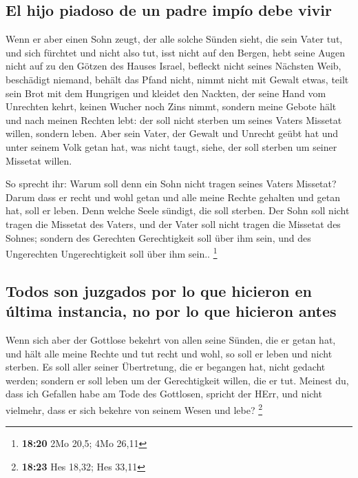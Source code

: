 \hypertarget{el-hijo-piadoso-de-un-padre-impuxedo-debe-vivir}{%
\subsection{El hijo piadoso de un padre impío debe
vivir}\label{el-hijo-piadoso-de-un-padre-impuxedo-debe-vivir}}

 Wenn er aber einen Sohn zeugt, der alle solche Sünden
sieht, die sein Vater tut, und sich fürchtet und nicht also tut,
 isst nicht auf den Bergen, hebt seine Augen nicht auf zu
den Götzen des Hauses Israel, befleckt nicht seines Nächsten Weib,
 beschädigt niemand, behält das Pfand nicht, nimmt nicht
mit Gewalt etwas, teilt sein Brot mit dem Hungrigen und kleidet den
Nackten,  der seine Hand vom Unrechten kehrt, keinen
Wucher noch Zins nimmt, sondern meine Gebote hält und nach meinen
Rechten lebt: der soll nicht sterben um seines Vaters Missetat willen,
sondern leben.  Aber sein Vater, der Gewalt und Unrecht
geübt hat und unter seinem Volk getan hat, was nicht taugt, siehe, der
soll sterben um seiner Missetat willen.

 So sprecht ihr: Warum soll denn ein Sohn nicht tragen
seines Vaters Missetat? Darum dass er recht und wohl getan und alle
meine Rechte gehalten und getan hat, soll er leben.  Denn
welche Seele sündigt, die soll sterben. Der Sohn soll nicht tragen die
Missetat des Vaters, und der Vater soll nicht tragen die Missetat des
Sohnes; sondern des Gerechten Gerechtigkeit soll über ihm sein, und des
Ungerechten Ungerechtigkeit soll über ihm sein.. \footnote{\textbf{18:20}
  2Mo 20,5; 4Mo 26,11}

\hypertarget{todos-son-juzgados-por-lo-que-hicieron-en-uxfaltima-instancia-no-por-lo-que-hicieron-antes}{%
\subsection{Todos son juzgados por lo que hicieron en última instancia,
no por lo que hicieron
antes}\label{todos-son-juzgados-por-lo-que-hicieron-en-uxfaltima-instancia-no-por-lo-que-hicieron-antes}}

 Wenn sich aber der Gottlose bekehrt von allen seine
Sünden, die er getan hat, und hält alle meine Rechte und tut recht und
wohl, so soll er leben und nicht sterben.  Es soll aller
seiner Übertretung, die er begangen hat, nicht gedacht werden; sondern
er soll leben um der Gerechtigkeit willen, die er tut. 
Meinest du, dass ich Gefallen habe am Tode des Gottlosen, spricht der
HErr, und nicht vielmehr, dass er sich bekehre von seinem Wesen und
lebe? \footnote{\textbf{18:23} Hes 18,32; Hes 33,11}

